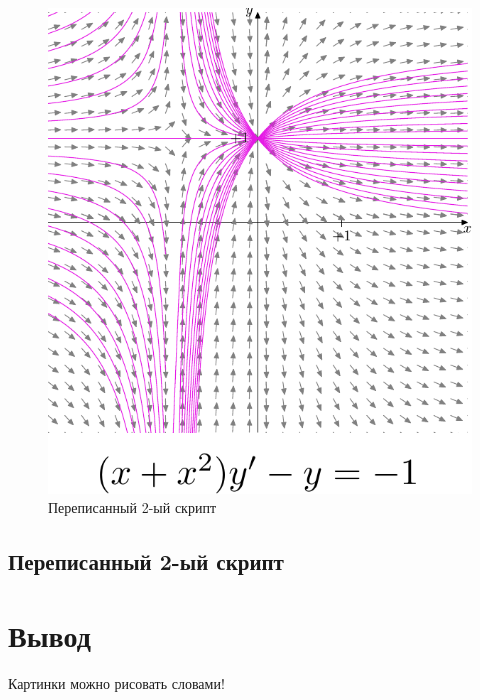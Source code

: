 \begin{figure}[h]
    \includegraphics{myfig2-1.pdf}
    \centering
    \caption{Переписанный 2-ый скрипт}
\end{figure}

\section*{Переписанный 2-ый скрипт}


\chapter{Вывод}

Картинки можно рисовать словами\cite{mpost}!



